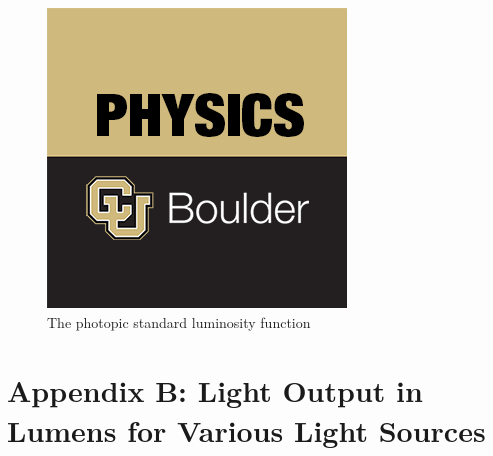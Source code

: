 \documentclass[10pt]{PhysLab1C} %
\begin{document}
\begin{figure}
    \centering
    \includegraphics{tmp.png}
    \caption{The photopic standard luminosity function}
    \label{lum}
\end{figure}



\section*{Appendix B: Light Output in Lumens for Various Light Sources}


\end{document}
